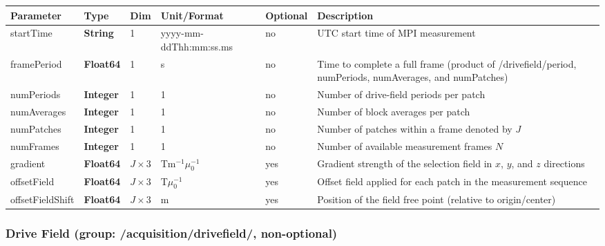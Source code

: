 \documentclass[landscape,a4paper]{article} %
\newcommand{\inltab}[1]{{\ttfamily\bfseries\color{blue}#1}}
\newcommand{\inlvar}[1]{{\ttfamily#1}}
\begin{document}
\noindent \begin{tabularx}{\columnwidth}{lllllX}
\textbf{Parameter} & \textbf{Type} & \textbf{Dim} & \textbf{Unit/Format} & \textbf{Optional} & \textbf{Description} \\ \hline
\inlvar{startTime} & \inltab{String} & 1 & yyyy-mm-ddThh:mm:ss.ms & no & UTC start time of MPI measurement \\ \hline
\inlvar{framePeriod} & \inltab{Float64} & 1 & s & no & Time to complete a full frame (product of \inlvar{/drivefield/period}, \inlvar{numPeriods}, \inlvar{numAverages}, and \inlvar{numPatches}) \\ \hline
\inlvar{numPeriods} & \inltab{Integer} & 1 & 1 & no & Number of drive-field periods per patch \\ \hline
\inlvar{numAverages} & \inltab{Integer} & 1 & 1& no & Number of block averages per patch\\ \hline
\inlvar{numPatches} & \inltab{Integer} & 1 & 1 & no & Number of patches within a frame denoted by $J$ \\ \hline
\inlvar{numFrames} & \inltab{Integer} & 1 & 1& no & Number of available measurement frames $N$ \\ \hline
\inlvar{gradient} & \inltab{Float64} & $J \times 3$ & Tm$^{-1}\mu_0^{-1}$ & yes & Gradient strength of the selection field in $x$, $y$, and $z$ directions \\ \hline
\inlvar{offsetField} & \inltab{Float64} & $J \times 3$ & T$\mu_0^{-1}$ & yes & Offset field applied for each patch in the measurement sequence \\ \hline
\inlvar{offsetFieldShift} & \inltab{Float64} & $J \times 3$ & m & yes & Position of the field free point (relative to origin/center) \\ \hline
\end{tabularx}

\subsubsection{Drive Field (group: \inlvar{/acquisition/drivefield/}, non-optional)}
\end{document}
